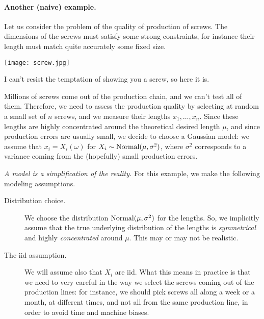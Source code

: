 \paragraph{Another (naive) example.}

Let us consider the problem of the quality of production of screws. 
The dimensions of the screws must satisfy some strong constraints, for instance their length must match quite accurately some fixed size.%
%
\begin{marginfigure}%
	\texttt{[image: screw.jpg]}%
	\caption{I can't resist the temptation of showing you a screw, so here it is.}%
\end{marginfigure}%
Millions of screws come out of the production chain, and we can't test all of them.
Therefore, we need to assess the production quality by selecting at random a small set of $n$ screws, and we measure their lengths $x_1, \ldots, x_n$.
Since these lengths are highly concentrated around the theoretical desired length $\mu$, and since production errors are usually small, we decide to choose a Gaussian model: we assume that $x_i = X_i(\omega)$ for $X_i \sim \operatorname{Normal}(\mu, \sigma^2)$, where $\sigma^2$ corresponds to a variance coming from the (hopefully) small production errors.

\emph{A model is a simplification of the reality.} For this example, we make the following modeling assumptions.
\begin{description}
	\item[Distribution choice.] We choose the distribution $\operatorname{Normal}(\mu, \sigma^2)$ for the lengths. So, we implicitly assume that the true underlying distribution of the lengths is \emph{symmetrical} and highly \emph{concentrated} around $\mu$. This may or may not be realistic.%
	\item[The iid assumption.] We will assume also that $X_i$ are iid. What this means in practice is that we need to very careful in the way we select the screws coming out of the production lines: for instance, we should pick screws all along a week or a month, at different times, and not all from the same production line, in order to avoid time and machine biases.
\end{description}

